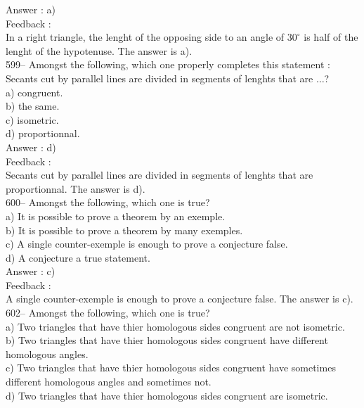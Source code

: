 \documentclass[letterpaper, 12pt]{article}
\begin{document}
Answer : a)\\

Feedback : \\
In a right triangle, the lenght of the opposing side to an angle of $30^{\circ}$ is half of the lenght of the hypotenuse.
The answer is a).\\

599-- Amongst the following, which one properly completes this statement : \og Secants cut by parallel lines are divided in segments of lenghts that are $\ldots$\fg?\\
a) congruent.\\
b) the same.\\
c) isometric.\\
d) proportionnal.\\

Answer : d)\\

Feedback : \\
Secants cut by parallel lines are divided in segments of lenghts that are proportionnal.  The answer is d).\\

600-- Amongst the following, which one is true?\\
a) It is possible to prove a theorem by an exemple.\\
b) It is possible to prove a theorem by many exemples.\\
c) A single counter-exemple is enough to prove a conjecture false.\\
d) A conjecture a true statement.\\

Answer : c)\\

Feedback : \\
A single counter-exemple is enough to prove a conjecture false.  The answer is c).\\



602-- Amongst the following, which one is true?\\
a) Two triangles that have thier homologous sides congruent are not isometric.\\
b) Two triangles that have thier homologous sides congruent have different homologous angles.\\
c) Two triangles that have thier homologous sides congruent have sometimes different homologous angles and sometimes not.\\
d) Two triangles that have thier homologous sides congruent are isometric.\\
\end{document}
